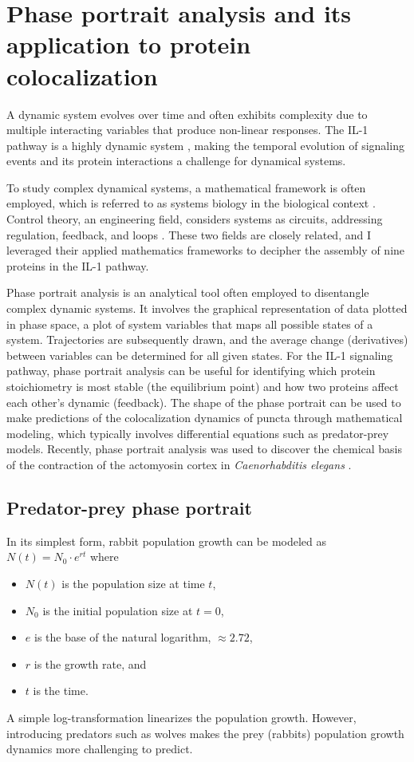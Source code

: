 \section{Phase portrait analysis and its application to protein colocalization}
\label{section:pp}
A dynamic system evolves over time and often exhibits complexity due to multiple interacting variables that produce non-linear responses. The IL-1 pathway is a highly dynamic system \autocite{Latty_2018}\autocite{Deliz-Aguirre_2021}, making the temporal evolution of signaling events and its protein interactions a challenge for dynamical systems.
 
To study complex dynamical systems, a mathematical framework is often employed, which is referred to as systems biology in the biological context \autocite{Wolkenhauer_2005}. Control theory, an engineering field, considers systems as circuits, addressing regulation, feedback, and loops \autocite{Kitano_2002}. These two fields are closely related, and I leveraged their applied mathematics frameworks to decipher the assembly of nine proteins in the IL-1 pathway.
 
Phase portrait analysis is an analytical tool often employed to disentangle complex dynamic systems. It involves the graphical representation of data plotted in phase space, a plot of system variables that maps all possible states of a system. Trajectories are subsequently drawn, and the average change (derivatives) between variables can be determined for all given states. For the IL-1 signaling pathway, phase portrait analysis can be useful for identifying which protein stoichiometry is most stable (the equilibrium point) and how two proteins affect each other’s dynamic (feedback). The shape of the phase portrait can be used to make predictions of the colocalization dynamics of puncta through mathematical modeling, which typically involves differential equations such as predator-prey models. Recently, phase portrait analysis was used to discover the chemical basis of the contraction of the actomyosin cortex in \emph{Caenorhabditis elegans} \autocite{Yan_2022}.
 
\subsection{Predator-prey phase portrait}
\label{subsection:predator_prey}
In its simplest form, rabbit population growth can be modeled as $N(t) = N_0 \cdot e^{rt}$ where
\begin{itemize}
\item $N(t)$ is the population size at time $t$,
\item $N_0$ is the initial population size at $t = 0$,
\item $e$ is the base of the natural logarithm, $\approx 2.72$,
\item $r$ is the growth rate, and
\item $t$ is the time.
\end{itemize}
A simple log-transformation linearizes the population growth. However, introducing predators such as wolves makes the prey (rabbits) population growth dynamics more challenging to predict.

